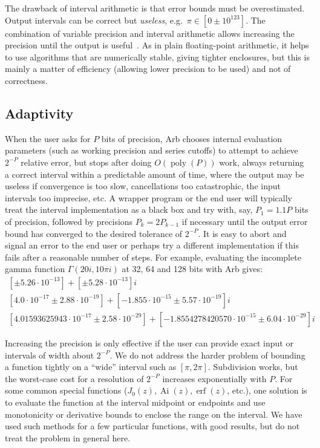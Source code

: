 \documentclass[11pt]{article}
\begin{document}
The drawback of interval arithmetic
is that error bounds must be overestimated.
Output intervals can be correct but
\emph{useless}, e.g.\ $\pi \in [0 \pm 10^{123}]$.
The combination of variable precision and interval arithmetic
allows increasing the precision until the output is useful~\cite{RevolRouillier2005}.
As in plain floating-point arithmetic, it helps to use algorithms
that are numerically stable, giving tighter enclosures,
but this is mainly a matter of efficiency (allowing lower precision to be used) and not of correctness.

\subsection{Adaptivity}

When the user asks for $P$ bits of precision,
Arb chooses internal evaluation parameters
(such as working precision and series cutoffs) to attempt to achieve $2^{-P}$
relative error, but stops
after doing $O(\operatorname{poly}(P))$ work, always returning a correct
interval within a predictable amount of time, where the output
may be useless if convergence is too slow,
cancellations too catastrophic, the input intervals too imprecise, etc.
A wrapper program or the end user will typically treat the
interval implementation as a black box and try
with, say, $P_1 = 1.1 P$ bits of precision, followed by precisions
$P_k = 2P_{k-1}$ if necessary until the output error bound has converged to
the desired tolerance of $2^{-P}$.
It is easy to abort and signal an error to the end user or
perhaps try a different implementation if
this fails after a reasonable number of steps.
For example, evaluating the incomplete gamma
function $\Gamma(20i, 10\pi i)$ at 32, 64 and 128 bits with Arb gives:
\begin{equation*}
\begin{array}{c}
{}[\pm 5.26 \cdot 10^{-13}] + [\pm 5.28 \cdot 10^{-13}]i \\
{}[4.0 \cdot 10^{-17} \pm 2.88 \cdot 10^{-19}] + [-1.855 \cdot 10^{-15} \pm 5.57 \cdot 10^{-19}]i \\
{}[4.01593625943 \cdot 10^{-17} \pm 2.58 \cdot 10^{-29}] + [-1.8554278420570 \cdot 10^{-15} \pm 6.04 \cdot 10^{-29}]i
\end{array}
\end{equation*}

Increasing the precision is only effective if the user can
provide exact input or intervals of width about $2^{-P}$.
We do not address the harder problem of bounding a function tightly
on a ``wide'' interval such as $[\pi,2\pi]$. Subdivision works,
but the worst-case cost for a resolution of $2^{-P}$ increases exponentially with $P$.
For some common special functions
($J_0(z), \operatorname{Ai}(z), \operatorname{erf}(z)$, etc.),
one solution is to evaluate the
function at the interval midpoint or endpoints and use
monotonicity or derivative bounds to enclose
the range on the interval.
We have used such methods for a few particular functions,
with good results, but do not treat the problem in general here.
\end{document}
